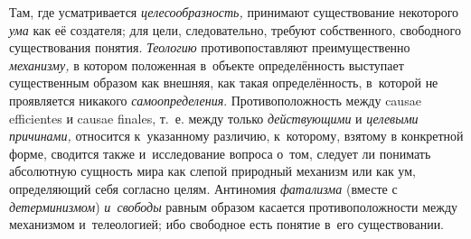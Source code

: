 Там, где усматривается
{\em целесообразность,}
принимают существование некоторого
{\em ума} как её
создателя; для цели, следовательно, требуют собственного, свободного
существования понятия. {\em Теологию}
противопоставляют преимущественно
{\em механизму,} в
котором положенная в~объекте определённость выступает существенным образом
как внешняя, как такая определённость, в~которой не проявляется никакого
{\em самоопределения}.
Противоположность между causae efficientes и
causae finales, т.~е. между только
{\em действующими} и
{\em целевыми причинами,}
относится к~указанному различию, к~которому, взятому в
конкретной форме, сводится также и~исследование вопроса о~том, следует ли
понимать абсолютную сущность мира как слепой природный механизм или как ум,
определяющий себя согласно целям. Антиномия
{\em фатализма} (вместе с
{\em детерминизмом})
{\em и~свободы} равным
образом касается противоположности между механизмом и~телеологией; ибо
свободное есть понятие в~его существовании.

